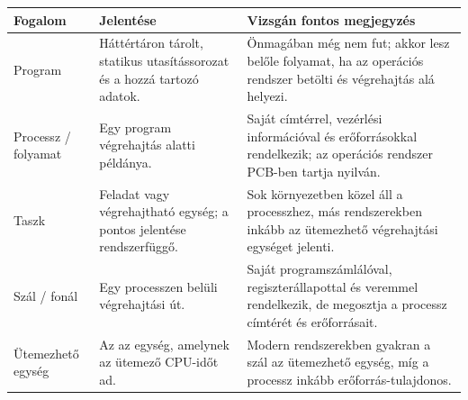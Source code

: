 \begin{tabularx}{\textwidth}{L{30mm}X X}
\toprule
\textbf{Fogalom} & \textbf{Jelentése} & \textbf{Vizsgán fontos megjegyzés} \\
\midrule
Program & Háttértáron tárolt, statikus utasítássorozat és a hozzá tartozó adatok. & Önmagában még nem fut; akkor lesz belőle folyamat, ha az operációs rendszer betölti és végrehajtás alá helyezi. \\
Processz / folyamat & Egy program végrehajtás alatti példánya. & Saját címtérrel, vezérlési információval és erőforrásokkal rendelkezik; az operációs rendszer PCB-ben tartja nyilván. \\
Taszk & Feladat vagy végrehajtható egység; a pontos jelentése rendszerfüggő. & Sok környezetben közel áll a processzhez, más rendszerekben inkább az ütemezhető végrehajtási egységet jelenti. \\
Szál / fonál & Egy processzen belüli végrehajtási út. & Saját programszámlálóval, regiszterállapottal és veremmel rendelkezik, de megosztja a processz címtérét és erőforrásait. \\
Ütemezhető egység & Az az egység, amelynek az ütemező CPU-időt ad. & Modern rendszerekben gyakran a szál az ütemezhető egység, míg a processz inkább erőforrás-tulajdonos. \\
\bottomrule
\end{tabularx}
